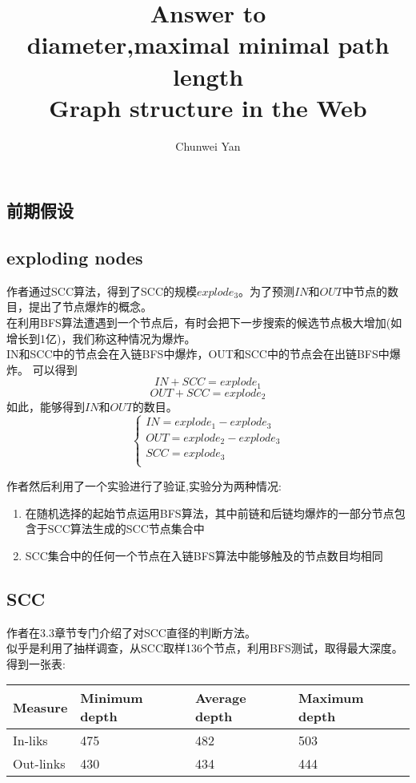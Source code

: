 \documentclass[a4paper]{ctexart}
\author{Chunwei Yan}
\title{Answer to \\ diameter,maximal minimal path length\\ Graph structure in the Web}
\begin{document}
    \maketitle
\begin{multicols}{2}
\section{前期假设}
\subsection{exploding nodes}

作者通过SCC算法，得到了SCC的规模$explode_3$。为了预测$IN$和$OUT$中节点的数目，提出了节点爆炸的概念。\\
在利用BFS算法遭遇到一个节点后，有时会把下一步搜索的候选节点极大增加(如增长到1亿)，我们称这种情况为爆炸。\\
IN和SCC中的节点会在入链BFS中爆炸，OUT和SCC中的节点会在出链BFS中爆炸。 
可以得到
$$
IN + SCC = explode_1
$$
$$
OUT + SCC = explode_2
$$
如此，能够得到$IN$和$OUT$的数目。
$$
\begin{cases}
IN=explode_1 - explode_3\\
OUT=explode_2 - explode_3\\
SCC=explode_3\\
\end{cases}
$$

\par
作者然后利用了一个实验进行了验证,实验分为两种情况:
\begin{enumerate}
    \item 在随机选择的起始节点运用BFS算法，其中前链和后链均爆炸的一部分节点包含于SCC算法生成的SCC节点集合中
    \item SCC集合中的任何一个节点在入链BFS算法中能够触及的节点数目均相同
\end{enumerate}

\subsection{SCC}
作者在3.3章节专门介绍了对SCC直径的判断方法。\\
似乎是利用了抽样调查，从SCC取样136个节点，利用BFS测试，取得最大深度。得到一张表:
\\
\begin{tabular}{  l  l  l  l }
\hline
Measure& Minimum depth& Average depth& Maximum depth\\
\hline
In-liks& 475& 482& 503\\
Out-links& 430& 434& 444\\
\hline
\end{tabular}
\\


\end{multicols}
\end{document}
